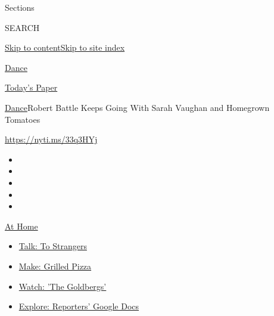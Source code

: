 Sections

SEARCH

\protect\hyperlink{site-content}{Skip to
content}\protect\hyperlink{site-index}{Skip to site index}

\href{https://www.nytimes3xbfgragh.onion/section/arts/dance}{Dance}

\href{https://myaccount.nytimes3xbfgragh.onion/auth/login?response_type=cookie\&client_id=vi}{}

\href{https://www.nytimes3xbfgragh.onion/section/todayspaper}{Today's
Paper}

\href{/section/arts/dance}{Dance}\textbar{}Robert Battle Keeps Going
With Sarah Vaughan and Homegrown Tomatoes

\url{https://nyti.ms/33q3HYj}

\begin{itemize}
\item
\item
\item
\item
\item
\end{itemize}

\href{https://www.nytimes3xbfgragh.onion/spotlight/at-home?action=click\&pgtype=Article\&state=default\&region=TOP_BANNER\&context=at_home_menu}{At
Home}

\begin{itemize}
\tightlist
\item
  \href{https://www.nytimes3xbfgragh.onion/2020/08/03/well/family/the-benefits-of-talking-to-strangers.html?action=click\&pgtype=Article\&state=default\&region=TOP_BANNER\&context=at_home_menu}{Talk:
  To Strangers}
\item
  \href{https://www.nytimes3xbfgragh.onion/2020/08/01/at-home/coronavirus-make-pizza-on-a-grill.html?action=click\&pgtype=Article\&state=default\&region=TOP_BANNER\&context=at_home_menu}{Make:
  Grilled Pizza}
\item
  \href{https://www.nytimes3xbfgragh.onion/2020/07/31/arts/television/goldbergs-abc-stream.html?action=click\&pgtype=Article\&state=default\&region=TOP_BANNER\&context=at_home_menu}{Watch:
  'The Goldbergs'}
\item
  \href{https://www.nytimes3xbfgragh.onion/interactive/2020/at-home/even-more-reporters-editors-diaries-lists-recommendations.html?action=click\&pgtype=Article\&state=default\&region=TOP_BANNER\&context=at_home_menu}{Explore:
  Reporters' Google Docs}
\end{itemize}

